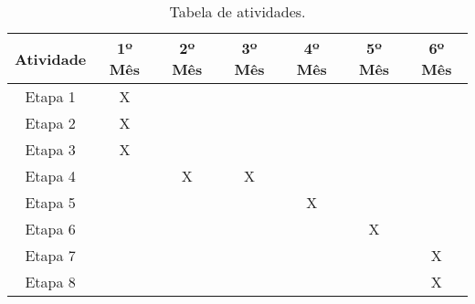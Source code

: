 \begin{table}[!htb]
    \centering
    \caption[Tabela de atividades]{Tabela de atividades.
    \label{tab:tabela-exemplo1}}
    \begin{tabular}{|c|c|c|c|c|c|c|}
    	\hline
    	Atividade & 1º Mês & 2º Mês & 3º Mês & 4º Mês & 5º Mês & 6º Mês \\ \hline
    	Etapa 1 & X &   &   &   &   &   \\ \hline
    	Etapa 2 & X &   &   &   &   &   \\ \hline
    	Etapa 3 & X &   &   &   &   &   \\ \hline
    	Etapa 4 &   & X & X &   &   &   \\ \hline
    	Etapa 5 &   &   &   & X &   &   \\ \hline
    	Etapa 6 &   &   &   &   & X &   \\ \hline
    	Etapa 7 &   &   &   &   &   & X \\ \hline
    	Etapa 8 &   &   &   &   &   & X \\ \hline
    \end{tabular}
\end{table}
